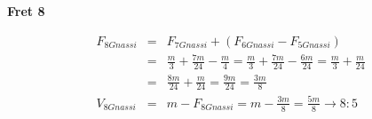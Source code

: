 \textbf{Fret 8}

\begin{eqnarray*}
    F_{8Gnassi}
        &=& F_{7Gnassi} + (F_{6Gnassi} - F_{5Gnassi}) \\
        &=& \frac{m}{3} + \frac{7m}{24} - \frac{m}{4}
        = \frac{m}{3} + \frac{7m}{24} - \frac{6m}{24}
        = \frac{m}{3} + \frac{m}{24} \\
        &=& \frac{8m}{24} + \frac{m}{24}
        = \frac{9m}{24}
        = \frac{3m}{8} \\
    V_{8Gnassi}
        &=& m - F_{8Gnassi}
        = m - \frac{3m}{8}
        = \frac{5m}{8}
        \to 8:5
\end{eqnarray*}

